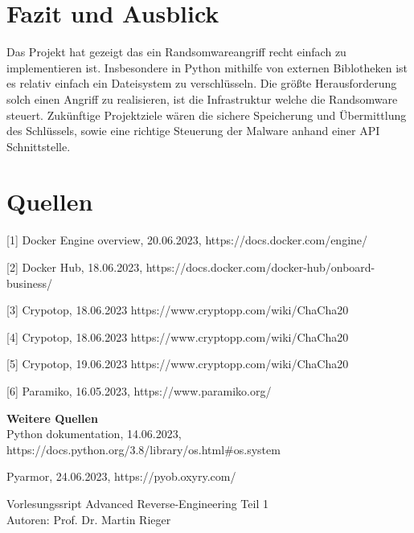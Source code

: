 \documentclass[12pt]{article}
\begin{document}
\section{Fazit und Ausblick}
Das Projekt hat gezeigt das ein Randsomwareangriff recht einfach zu implementieren ist. Insbesondere in Python mithilfe von externen Biblotheken ist es relativ einfach ein Dateisystem zu verschlüsseln. Die größte Herausforderung solch einen Angriff zu realisieren, ist die Infrastruktur welche die Randsomware steuert.
Zukünftige Projektziele wären die sichere Speicherung und Übermittlung des Schlüssels, sowie eine richtige Steuerung der Malware anhand einer API Schnittstelle.
\newpage
\section{Quellen}
[1] Docker Engine overview, 20.06.2023, https://docs.docker.com/engine/

\vspace{4mm}


[2] Docker Hub, 18.06.2023, https://docs.docker.com/docker-hub/onboard-business/
\vspace{4mm}

[3] Crypotop, 18.06.2023 https://www.cryptopp.com/wiki/ChaCha20
\vspace{4mm}

[4] Crypotop, 18.06.2023 https://www.cryptopp.com/wiki/ChaCha20

\vspace{4mm}

[5] Crypotop, 19.06.2023 https://www.cryptopp.com/wiki/ChaCha20
\vspace{4mm}

[6] Paramiko, 16.05.2023, https://www.paramiko.org/

\textbf{Weitere Quellen}\\

Python dokumentation, 14.06.2023, https://docs.python.org/3.8/library/os.html\#os.system

Pyarmor, 24.06.2023, https://pyob.oxyry.com/

Vorlesungssript Advanced Reverse-Engineering
Teil 1\\
Autoren:
Prof. Dr. Martin Rieger

		
\end{document}
